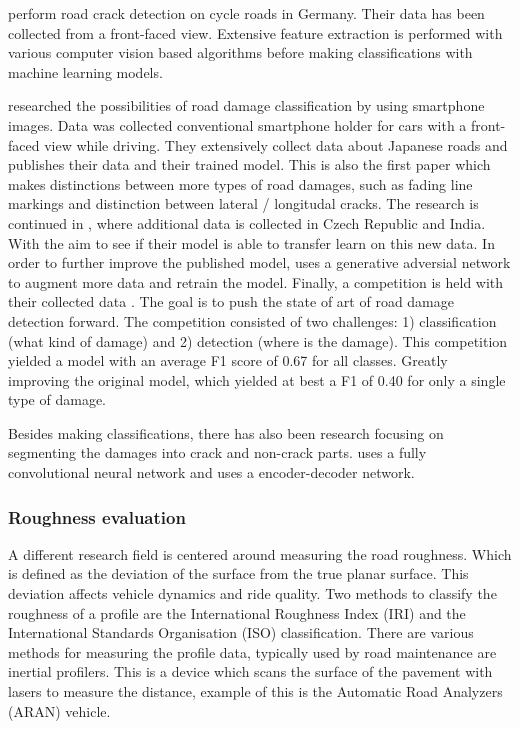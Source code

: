  perform road crack detection on cycle roads in Germany. Their data has been collected from a front-faced view. Extensive feature extraction is performed with various computer vision based algorithms before making classifications with machine learning models. 

 researched the possibilities of road damage classification by using smartphone images. Data was collected conventional smartphone holder for cars with a front-faced view while driving. They extensively collect data about Japanese roads and publishes their data and their trained model. This is also the first paper which makes distinctions between more types of road damages, such as fading line markings and distinction between lateral / longitudal cracks. The research is continued in , where additional data is collected in Czech Republic and India. With the aim to see if their model is able to transfer learn on this new data. In order to further improve the published model,  uses a generative adversial network to augment more data and retrain the model. Finally, a competition is held with their collected data \cite{Arya2020-competition}. The goal is to push the state of art of road damage detection forward. The competition consisted of two challenges: 1) classification (what kind of damage) and 2) detection (where is the damage). This competition yielded a model with an average F1 score of 0.67 for all classes. Greatly improving the original model, which yielded at best a F1 of 0.40 for only a single type of damage.

Besides making classifications, there has also been research focusing on segmenting the damages into crack and non-crack parts.  uses a fully convolutional neural network and  uses a encoder-decoder network.


\subsubsection{Roughness evaluation}
A different research field is centered around measuring the road roughness. Which is defined as the deviation of the surface from the true planar surface. This deviation affects vehicle dynamics and ride quality. Two methods to classify the roughness of a profile are the International Roughness Index (IRI) \cite{Sayers1986} and the International Standards Organisation (ISO) \cite{ISO8608} classification. There are various methods for measuring the profile data, typically used by road maintenance are inertial profilers. This is a device which scans the surface of the pavement with lasers to measure the distance, example of this is the Automatic Road Analyzers (ARAN) vehicle.

